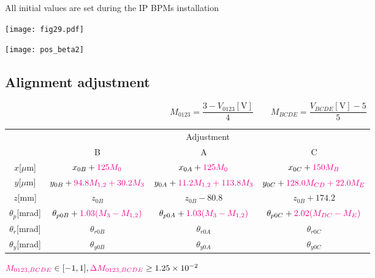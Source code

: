 \vspace*{-0.4cm}All initial values are set during the IP BPMs installation\par
\texttt{[image: fig29.pdf]}\par
\texttt{[image: pos\_beta2]}
\raggedright

\subsection{Alignment adjustment}
\centering
\begin{equation}
 M_{0123}=\frac{3-V_{0123}[\text{V}]}{4} \qquad M_{BCDE}=\frac{V_{BCDE}[\text{V}]-5}{5}
\end{equation}
\begin{tabular}{|c||c|c|c|}\hline
 &\multicolumn{3}{|c|}{Adjustment}\\\cline{2-4}
 & B & A & C\\\hline\hline
$x$[$\mu$m] & $x_{0B}+{\color{magenta}125M_0}$ & $x_{0A}+{\color{magenta}125M_0}$&${x_{0C}+\color{magenta}150M_{B}}$\\
$y$[$\mu$m]& $y_{0B}+{\color{magenta}94.8M_{1,2}+30.2M_3}$&$y_{0A}+{\color{magenta}11.2M_{1,2}+113.8M_3}$&$y_{0C}+{\color{magenta}128.0M_{CD}+22.0M_E}$\\
$z$[mm]&$z_{0B}$&$z_{0B}-80.8$&$z_{0B}+174.2$\\
$\theta_{p}$[mrad]& $\theta_{p0B}+{\color{magenta}1.03(M_3-M_{1,2})}$ & $\theta_{p0A}+{\color{magenta}1.03(M_3-M_{1,2})}$ &$\theta_{p0C}+{\color{magenta} 2.02(M_{DC}-M_E)}$\\
$\theta_{r}$[mrad]&$\theta_{r0B}$&$\theta_{r0A}$&$\theta_{r0C}$\\
$\theta_{y}$[mrad]&$\theta_{y0B}$&$\theta_{y0A}$&$\theta_{y0C}$\\\hline
\end{tabular}\par
${\color{magenta} M_{0123,BCDE}}\in[-1,1],{\color{magenta}\Delta M_{0123,BCDE}}\geq1.25\times 10^{-2}$

